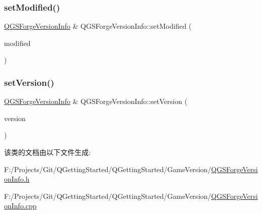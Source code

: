 \mbox{\label{class_q_g_s_forge_version_info_abdfd1ae514663563196333975867496e}} 
\subsubsection{\texorpdfstring{set\+Modified()}{setModified()}}
{\footnotesize\ttfamily \mbox{\hyperlink{class_q_g_s_forge_version_info}{Q\+G\+S\+Forge\+Version\+Info}} \& Q\+G\+S\+Forge\+Version\+Info\+::set\+Modified (\begin{DoxyParamCaption}\item[{const Q\+String \&}]{modified }\end{DoxyParamCaption})}

\mbox{\label{class_q_g_s_forge_version_info_a393fec44f191cdc7ed22adc3f00dad63}} 
\subsubsection{\texorpdfstring{set\+Version()}{setVersion()}}
{\footnotesize\ttfamily \mbox{\hyperlink{class_q_g_s_forge_version_info}{Q\+G\+S\+Forge\+Version\+Info}} \& Q\+G\+S\+Forge\+Version\+Info\+::set\+Version (\begin{DoxyParamCaption}\item[{const Q\+String \&}]{version }\end{DoxyParamCaption})}



该类的文档由以下文件生成\+:\begin{DoxyCompactItemize}
\item 
F\+:/\+Projects/\+Git/\+Q\+Getting\+Started/\+Q\+Getting\+Started/\+Game\+Version/\mbox{\hyperlink{_q_g_s_forge_version_info_8h}{Q\+G\+S\+Forge\+Version\+Info.\+h}}\item 
F\+:/\+Projects/\+Git/\+Q\+Getting\+Started/\+Q\+Getting\+Started/\+Game\+Version/\mbox{\hyperlink{_q_g_s_forge_version_info_8cpp}{Q\+G\+S\+Forge\+Version\+Info.\+cpp}}\end{DoxyCompactItemize}
